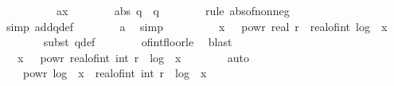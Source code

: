 \begin{isabellebody}
\ \ \isamarkupfalse%
\ {\isacharminus}{\kern0pt}\isanewline
\ \ \ \ \isamarkupfalse%
\ a{\isacharcolon}{\kern0pt}{\isachardoublequoteopen}x\ {\isachargreater}{\kern0pt}\ {}{\isachardoublequoteclose}\isanewline
\isanewline
\ \ \ \ \isamarkupfalse%
\ {\isachardoublequoteopen}abs\ q\ {\isacharequal}{\kern0pt}\ q{\isachardoublequoteclose}\isanewline
\ \ \ \ \ \ \isamarkupfalse%
\ {\isacharparenleft}{\kern0pt}rule\ abs{\isacharunderscore}{\kern0pt}of{\isacharunderscore}{\kern0pt}nonneg{\isacharparenright}{\kern0pt}\isanewline
\ \ \ \ \ \ \isamarkupfalse%
\ {\isacharparenleft}{\kern0pt}simp\ add{\isacharcolon}{\kern0pt}q{\isacharunderscore}{\kern0pt}def{\isacharparenright}{\kern0pt}\isanewline
\ \ \ \ \ \ \isamarkupfalse%
\ a\ \isamarkupfalse%
\ simp\isanewline
\ \ \ \ \isamarkupfalse%
\ \isamarkupfalse%
\ {\isachardoublequoteopen}{\isachardot}{\kern0pt}{\isachardot}{\kern0pt}{\isachardot}{\kern0pt}\ {\isasymle}\ x\ {\isacharasterisk}{\kern0pt}\ {}\ powr\ {\isacharparenleft}{\kern0pt}real\ r\ {\isacharminus}{\kern0pt}\ real{\isacharunderscore}{\kern0pt}of{\isacharunderscore}{\kern0pt}int\ {\isasymlfloor}log\ {}\ {\isasymbar}x{\isasymbar}{\isasymrfloor}{\isacharparenright}{\kern0pt}{\isachardoublequoteclose}\isanewline
\ \ \ \ \ \ \isamarkupfalse%
\ {\isacharparenleft}{\kern0pt}subst\ q{\isacharunderscore}{\kern0pt}def{\isacharparenright}{\kern0pt}\isanewline
\ \ \ \ \ \ \isamarkupfalse%
\ of{\isacharunderscore}{\kern0pt}int{\isacharunderscore}{\kern0pt}floor{\isacharunderscore}{\kern0pt}le\ \isamarkupfalse%
\ blast\isanewline
\ \ \ \ \isamarkupfalse%
\ \isamarkupfalse%
\ {\isachardoublequoteopen}{\isachardot}{\kern0pt}{\isachardot}{\kern0pt}{\isachardot}{\kern0pt}\ {\isacharequal}{\kern0pt}\ x\ {\isacharasterisk}{\kern0pt}\ {}\ powr\ real{\isacharunderscore}{\kern0pt}of{\isacharunderscore}{\kern0pt}int\ {\isacharparenleft}{\kern0pt}int\ r\ {\isacharminus}{\kern0pt}\ {\isasymlfloor}log\ {}\ {\isasymbar}x{\isasymbar}{\isasymrfloor}{\isacharparenright}{\kern0pt}{\isachardoublequoteclose}\isanewline
\ \ \ \ \ \ \isamarkupfalse%
\ auto\isanewline
\ \ \ \ \isamarkupfalse%
\ \isamarkupfalse%
\ {\isachardoublequoteopen}{\isachardot}{\kern0pt}{\isachardot}{\kern0pt}{\isachardot}{\kern0pt}\ {\isacharequal}{\kern0pt}\ {}\ powr\ {\isacharparenleft}{\kern0pt}log\ {}\ x\ {\isacharplus}{\kern0pt}\ real{\isacharunderscore}{\kern0pt}of{\isacharunderscore}{\kern0pt}int\ {\isacharparenleft}{\kern0pt}int\ r\ {\isacharminus}{\kern0pt}\ {\isasymlfloor}log\ {}\ {\isasymbar}x{\isasymbar}{\isasymrfloor}{\isacharparenright}{\kern0pt}{\isacharparenright}{\kern0pt}{\isachardoublequoteclose}\isanewline

\end{isabellebody}

